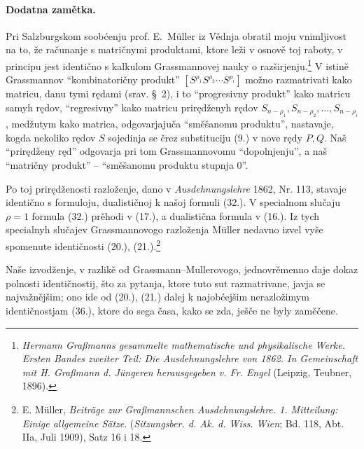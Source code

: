 \documentclass[11pt]{article}
\begin{document}
\paragraph{Dodatna zamětka.} Pri Salzburgskom soobćenju prof. \mbox{E. Müller} iz Vědnja obratil moju vnimljivost na to, že računanje s matričnymi produktami, ktore leži v osnově toj raboty, v principu jest identično s kalkulom Grassmannovej nauky o razširjenju.\footnote{\emph{Hermann Graßmanns gesammelte mathematische und physikalische Werke. Ersten Bandes zweiter Teil: Die Ausdehnungslehre von 1862. In Gemeinschaft mit H. Graßmann d. Jüngeren herausgegeben v. Fr. Engel} (Leipzig, Teubner, 1896).} V istině Grassmannov ``kombinatoričny produkt'' $[S^{\rho_1}S^{\rho_2}\cdots S^{\rho_i}]$ možno razmatrivati kako matricu, danu tymi rędami (srav. \S\ 2), i to ``progresivny produkt'' kako matricu samyh rędov, ``regresivny'' kako matricu prirędženyh rędov $S_{n-\rho_1},S_{n-\rho_2},\ldots,S_{n-\rho_i}$, medžutym kako matrica, odgovarjajuča ``směšanomu produktu'', nastavaje, kogda nekoliko rędov $S$ sojedinja se črez substituciju (9.) v nove rędy $P,Q$. Naš ``prirędženy ręd'' odgovarja pri tom Grassmannovomu ``dopolnjenju'', a naš ``matričny produkt'' -- ``směšanomu produktu stupnja 0''.

Po toj prirędženosti razloženje, dano v \emph{Ausdehnungslehre} 1862, Nr. 113, stavaje identično s formuloju, dualističnoj k našoj formuli (32.). V specialnom slučaju $\rho=1$ formula (32.) prěhodi v (17.), a dualistična formula v (16.). Iz tych specialnyh slučajev Grassmannovogo razloženja \mbox{Müller} nedavno izvel vyše spomenute identičnosti (20.), (21.).\footnote{E. \mbox{Müller}, \emph{Beiträge zur Graßmannschen Ausdehnungslehre. 1. Mitteilung: Einige allgemeine Sätze}. (\emph{Sitzungsber. d. Ak. d. Wiss. Wien}; Bd. 118, Abt. IIa, Juli 1909), Satz 16 i 18.}

Naše izvodženje, v razlikě od Grassmann--Mullerovogo, jednovrěmenno daje dokaz polnosti identičnostij, što za pytanja, ktore tuto sut razmatrivane, javja se najvažnějšim; ono ide od (20.), (21.) dalej k najobćejšim nerazložimym identičnostjam (36.), ktore do sega časa, kako se zda, ješče ne byly zaměčene.
\end{document}

